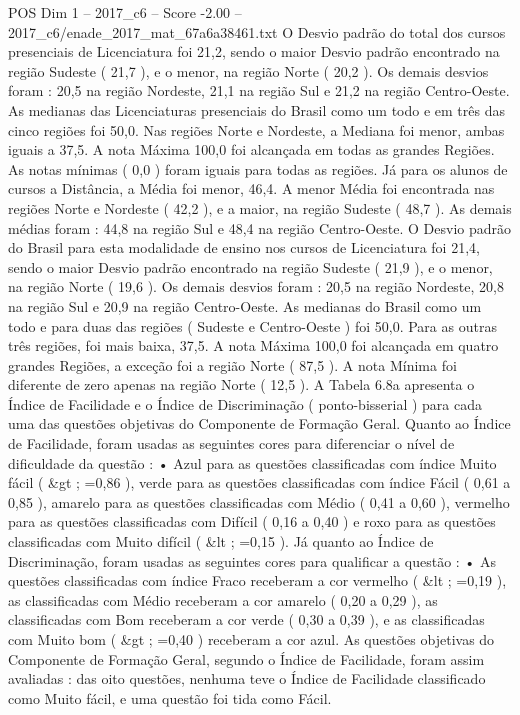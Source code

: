 \begin{textsample}{POS Dim 1 – 2017\_c6 – Score -2.00 – 2017\_c6/enade\_2017\_mat\_67a6a38461.txt}
O Desvio padrão do total dos cursos presenciais de Licenciatura foi 21,2, sendo o maior Desvio padrão encontrado na região Sudeste ( 21,7 ), e o menor, na região Norte ( 20,2 ).
Os demais desvios foram : 20,5 na região Nordeste, 21,1 na região Sul e 21,2 na região Centro-Oeste.
As medianas das Licenciaturas presenciais do Brasil como um todo e em três das cinco regiões foi 50,0.
Nas regiões Norte e Nordeste, a Mediana foi menor, ambas iguais a 37,5.
A nota Máxima 100,0 foi alcançada em todas as grandes Regiões.
As notas mínimas ( 0,0 ) foram iguais para todas as regiões.
Já para os alunos de cursos a Distância, a Média foi menor, 46,4.
A menor Média foi encontrada nas regiões Norte e Nordeste ( 42,2 ), e a maior, na região Sudeste ( 48,7 ).
As demais médias foram : 44,8 na região Sul e 48,4 na região Centro-Oeste.
O Desvio padrão do Brasil para esta modalidade de ensino nos cursos de Licenciatura foi 21,4, sendo o maior Desvio padrão encontrado na região Sudeste ( 21,9 ), e o menor, na região Norte ( 19,6 ).
Os demais desvios foram : 20,5 na região Nordeste, 20,8 na região Sul e 20,9 na região Centro-Oeste.
As medianas do Brasil como um todo e para duas das regiões ( Sudeste e Centro-Oeste ) foi 50,0.
Para as outras três regiões, foi mais baixa, 37,5.
A nota Máxima 100,0 foi alcançada em quatro grandes Regiões, a exceção foi a região Norte ( 87,5 ).
A nota Mínima foi diferente de zero apenas na região Norte ( 12,5 ).
A Tabela 6.8a apresenta o Índice de Facilidade e o Índice de Discriminação ( ponto-bisserial ) para cada uma das questões objetivas do Componente de Formação Geral.
Quanto ao Índice de Facilidade, foram usadas as seguintes cores para diferenciar o nível de dificuldade da questão : • Azul para as questões classificadas com índice Muito fácil ( \&gt ; =0,86 ), verde para as questões classificadas com índice Fácil ( 0,61 a 0,85 ), amarelo para as questões classificadas com Médio ( 0,41 a 0,60 ), vermelho para as questões classificadas com Difícil ( 0,16 a 0,40 ) e roxo para as questões classificadas com Muito difícil ( \&lt ; =0,15 ).
Já quanto ao Índice de Discriminação, foram usadas as seguintes cores para qualificar a questão : • As questões classificadas com índice Fraco receberam a cor vermelho ( \&lt ; =0,19 ), as classificadas com Médio receberam a cor amarelo ( 0,20 a 0,29 ), as classificadas com Bom receberam a cor verde ( 0,30 a 0,39 ), e as classificadas com Muito bom ( \&gt ; =0,40 ) receberam a cor azul.
As questões objetivas do Componente de Formação Geral, segundo o Índice de Facilidade, foram assim avaliadas : das oito questões, nenhuma teve o Índice de Facilidade classificado como Muito fácil, e uma questão foi tida como Fácil.

\end{textsample}
